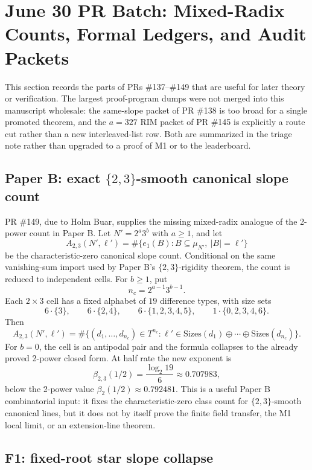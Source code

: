 \documentclass[11pt]{article}
\begin{document}
\section{June 30 PR Batch: Mixed-Radix Counts, Formal Ledgers, and Audit Packets}
\label{sec:jun30-pr-packets}

This section records the parts of PRs \#137--\#149 that are useful for later
theory or verification.  The largest proof-program dumps were not merged into
this manuscript wholesale: the same-slope packet of PR \#138 is too broad for a
single promoted theorem, and the \(a=327\) RIM packet of PR \#145 is explicitly
a route cut rather than a new interleaved-list row.  Both are summarized in the
triage note rather than upgraded to a proof of M1 or to the leaderboard.

\subsection{Paper B: exact \(\{2,3\}\)-smooth canonical slope count}

PR \#149, due to Holm Buar, supplies the missing mixed-radix analogue of the
2-power count in Paper B.  Let \(N'=2^a3^b\) with \(a\ge1\), and let
\[
  A_{2,3}(N',\ell')
  =
  \#\{e_1(B):B\subseteq\mu_{N'},\ |B|=\ell'\}
\]
be the characteristic-zero canonical slope count.  Conditional on the same
vanishing-sum import used by Paper B's \(\{2,3\}\)-rigidity theorem, the count
is reduced to independent cells.  For \(b\ge1\), put
\[
  n_c=2^{a-1}3^{b-1}.
\]
Each \(2\times3\) cell has a fixed alphabet of \(19\) difference types, with
size sets
\[
  6\cdot\{3\},\qquad
  6\cdot\{2,4\},\qquad
  6\cdot\{1,2,3,4,5\},\qquad
  1\cdot\{0,2,3,4,6\}.
\]
Then
\[
  A_{2,3}(N',\ell')
  =
  \#\{(d_1,\ldots,d_{n_c})\in T^{n_c}:
      \ell'\in \mathrm{Sizes}(d_1)\oplus\cdots\oplus
      \mathrm{Sizes}(d_{n_c})\}.
\]
For \(b=0\), the cell is an antipodal pair and the formula collapses to the
already proved 2-power closed form.  At half rate the new exponent is
\[
  \beta_{2,3}(1/2)=\frac{\log_2 19}{6}\approx0.707983,
\]
below the 2-power value \(\beta_2(1/2)\approx0.792481\).  This is a useful
Paper B combinatorial input: it fixes the characteristic-zero class count for
\(\{2,3\}\)-smooth canonical lines, but it does not by itself prove the finite
field transfer, the M1 local limit, or an extension-line theorem.

\subsection{F1: fixed-root star slope collapse}
\end{document}
